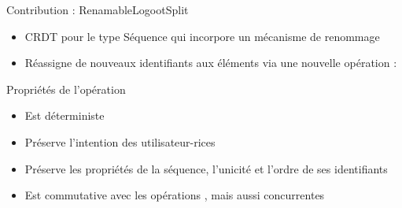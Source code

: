 \begin{frame}{Contribution : RenamableLogootSplit}
    \begin{itemize}
        \item CRDT pour le type Séquence qui incorpore un mécanisme de renommage
        \item Réassigne de nouveaux identifiants aux éléments via une nouvelle opération : \ren
    \end{itemize}
    \begin{block}{Propriétés de l'opération \ren}
        \begin{itemize}
            \item Est déterministe
            \item Préserve l'intention des utilisateur-rices
            \item Préserve les propriétés de la séquence, \ie l'unicité et l'ordre de ses identifiants
            \item Est commutative avec les opérations \ins, \rmv mais aussi \ren concurrentes
        \end{itemize}
    \end{block}
\end{frame}


